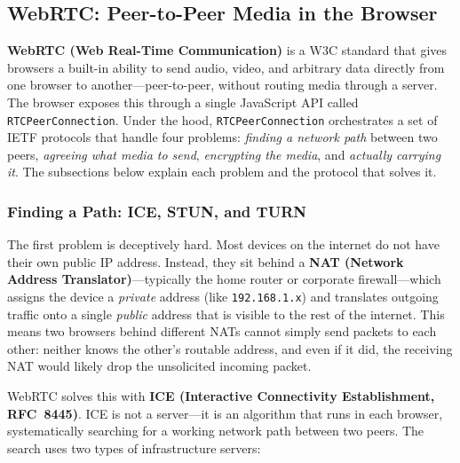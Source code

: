 \documentclass[11pt]{article}
\begin{document}
\subsection{WebRTC: Peer-to-Peer Media in the Browser}

\textbf{WebRTC (Web Real-Time Communication)} is a W3C standard that gives
browsers a built-in ability to send audio, video, and arbitrary data directly
from one browser to another---peer-to-peer, without routing media through a
server.  The browser exposes this through a single JavaScript API called
\texttt{RTCPeerConnection}.  Under the hood, \texttt{RTCPeerConnection}
orchestrates a set of IETF protocols that handle four problems:
\emph{finding a network path} between two peers, \emph{agreeing what media
to send}, \emph{encrypting the media}, and \emph{actually carrying it}.
The subsections below explain each problem and the protocol that solves it.

\subsubsection{Finding a Path: ICE, STUN, and TURN}

The first problem is deceptively hard.  Most devices on the internet do not
have their own public IP address.  Instead, they sit behind a
\textbf{NAT (Network Address Translator)}---typically the home router or
corporate firewall---which assigns the device a \emph{private} address
(like \texttt{192.168.1.x}) and translates outgoing traffic onto a single
\emph{public} address that is visible to the rest of the internet.  This
means two browsers behind different NATs cannot simply send packets to each
other: neither knows the other's routable address, and even if it did, the
receiving NAT would likely drop the unsolicited incoming packet.

WebRTC solves this with \textbf{ICE (Interactive Connectivity Establishment,
RFC~8445)}.  ICE is not a server---it is an algorithm that runs in each
browser, systematically searching for a working network path between two
peers.  The search uses two types of infrastructure servers:
\end{document}
